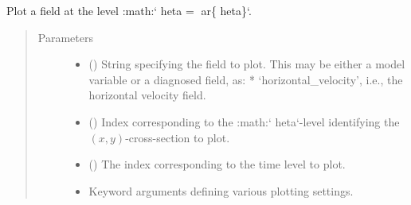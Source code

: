\documentclass[letterpaper,10pt,english]{sphinxmanual}
\begin{document}
\begin{fulllineitems}
\begin{fulllineitems}
\begin{quote}
\begin{description}
\end{description}\end{quote}

\end{fulllineitems}


\begin{fulllineitems}
\label{\detokenize{api:storages.isentropic_state.IsentropicState.plot_xy}}
Plot a field at the level :math:{}`       heta = ar\{     heta\}{}`.
\begin{quote}\begin{description}
\item[{Parameters}] \leavevmode\begin{itemize}
\item {} 
 () \textendash{} String specifying the field to plot. This may be
either a model variable or a diagnosed field, as:
* ‘horizontal\_velocity’, i.e., the horizontal velocity field.

\item {} 
 () \textendash{} Index corresponding to the :math:{}`       heta{}`-level identifying
the \((x,y)\)-cross-section to plot.

\item {} 
 () \textendash{} The index corresponding to the time level to plot.

\item {} 
 \textendash{} Keyword arguments defining various plotting settings.

\end{itemize}

\end{description}\end{quote}

\end{fulllineitems}



\end{fulllineitems}
\end{document}
